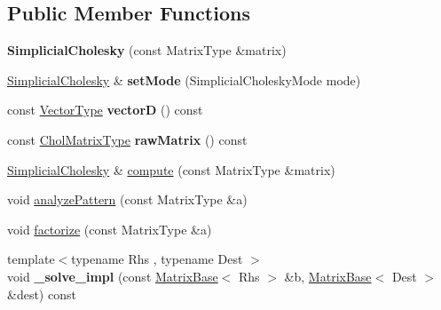 \subsection*{Public Member Functions}
\begin{DoxyCompactItemize}
\item 
\mbox{\label{class_eigen_1_1_simplicial_cholesky_a334b3ee515c49a9930bb7f0785cb4fc2}} 
{\bfseries Simplicial\+Cholesky} (const Matrix\+Type \&matrix)
\item 
\mbox{\label{class_eigen_1_1_simplicial_cholesky_a25e1d2336ca9c7ae5b3a723bea67ab42}} 
\mbox{\hyperlink{class_eigen_1_1_simplicial_cholesky}{Simplicial\+Cholesky}} \& {\bfseries set\+Mode} (Simplicial\+Cholesky\+Mode mode)
\item 
\mbox{\label{class_eigen_1_1_simplicial_cholesky_ae843051eff656868e8dc878ba6489603}} 
const \mbox{\hyperlink{class_eigen_1_1_matrix}{Vector\+Type}} {\bfseries vectorD} () const
\item 
\mbox{\label{class_eigen_1_1_simplicial_cholesky_a9b1509da967218cf463ae8793445868d}} 
const \mbox{\hyperlink{class_eigen_1_1_sparse_matrix}{Chol\+Matrix\+Type}} {\bfseries raw\+Matrix} () const
\item 
\mbox{\hyperlink{class_eigen_1_1_simplicial_cholesky}{Simplicial\+Cholesky}} \& \mbox{\hyperlink{class_eigen_1_1_simplicial_cholesky_a7883b49a88b26162ba6d8b044e2ee75b}{compute}} (const Matrix\+Type \&matrix)
\item 
void \mbox{\hyperlink{class_eigen_1_1_simplicial_cholesky_a6af3f64b855a96a2635302f863b5fd91}{analyze\+Pattern}} (const Matrix\+Type \&a)
\item 
void \mbox{\hyperlink{class_eigen_1_1_simplicial_cholesky_ab1b21d430cc2a8e332221313a4f2f2e3}{factorize}} (const Matrix\+Type \&a)
\item 
\mbox{\label{class_eigen_1_1_simplicial_cholesky_a268f4331cd8976ec6f106a34b97bba23}} 
{\footnotesize template$<$typename Rhs , typename Dest $>$ }\\void {\bfseries \+\_\+solve\+\_\+impl} (const \mbox{\hyperlink{class_eigen_1_1_matrix_base}{Matrix\+Base}}$<$ Rhs $>$ \&b, \mbox{\hyperlink{class_eigen_1_1_matrix_base}{Matrix\+Base}}$<$ Dest $>$ \&dest) const

\end{DoxyCompactItemize}
